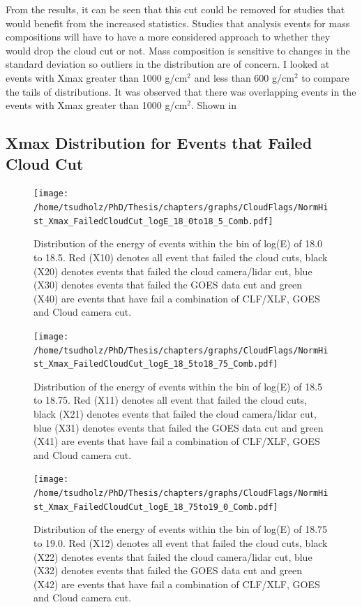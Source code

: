 From the results, it can be seen that this cut could be removed for studies that would benefit from the increased statistics. Studies that analysis events for mass compositions will have to have a more considered approach to whether they would drop the cloud cut or not. Mass composition is sensitive to changes in the standard deviation so outliers in the distribution are of concern. I looked at events with Xmax greater than 1000 g/cm$^2$ and less than 600 g/cm$^2$ to compare the tails of distributions. It was observed that there was overlapping events in the events with Xmax greater than 1000 g/cm$^2$. Shown in 


\subsection{Xmax Distribution for Events that Failed Cloud Cut}



\begin{figure}[!p]
\centering
\texttt{[image: /home/tsudholz/PhD/Thesis/chapters/graphs/CloudFlags/NormHist\_Xmax\_FailedCloudCut\_logE\_18\_0to18\_5\_Comb.pdf]}
\caption{Distribution of the energy of events within the bin of log(E) of 18.0 to 18.5. Red (X10) denotes all event that failed the cloud cuts, black (X20) denotes events that failed the cloud camera/lidar cut, blue (X30) denotes events that failed the GOES data cut and green (X40) are events that have fail a combination of CLF/XLF, GOES and Cloud camera cut.} \label{fig:CloudFlag_XmaxFailed_18.0}
\end{figure}

\begin{figure}[!p]
\centering
\texttt{[image: /home/tsudholz/PhD/Thesis/chapters/graphs/CloudFlags/NormHist\_Xmax\_FailedCloudCut\_logE\_18\_5to18\_75\_Comb.pdf]}
\caption{Distribution of the energy of events within the bin of log(E) of 18.5 to 18.75. Red (X11) denotes all event that failed the cloud cuts, black (X21) denotes events that failed the cloud camera/lidar cut, blue (X31) denotes events that failed the GOES data cut and green (X41) are events that have fail a combination of CLF/XLF, GOES and Cloud camera cut.} \label{fig:CloudFlag_XmaxFailed_18.5}
\end{figure}

\begin{figure}[!p]
\centering
\texttt{[image: /home/tsudholz/PhD/Thesis/chapters/graphs/CloudFlags/NormHist\_Xmax\_FailedCloudCut\_logE\_18\_75to19\_0\_Comb.pdf]}
\caption{Distribution of the energy of events within the bin of log(E) of 18.75 to 19.0. Red (X12) denotes all event that failed the cloud cuts, black (X22) denotes events that failed the cloud camera/lidar cut, blue (X32) denotes events that failed the GOES data cut and green (X42) are events that have fail a combination of CLF/XLF, GOES and Cloud camera cut.} \label{fig:CloudFlag_XmaxFailed_18.75}
\end{figure}

